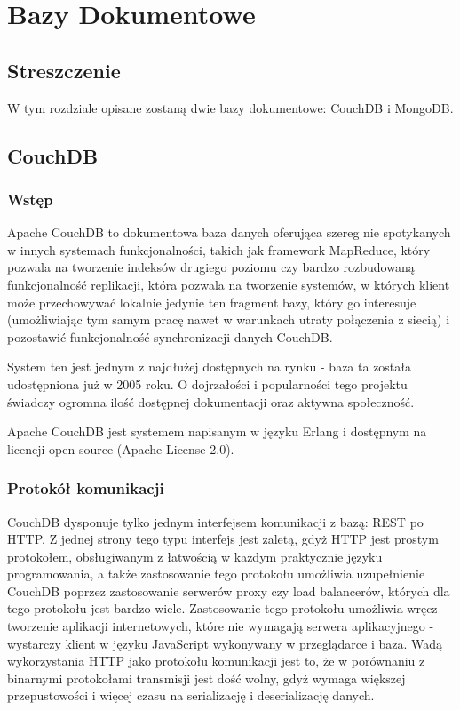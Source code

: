 \chapter{Bazy Dokumentowe}

\section*{Streszczenie}
W tym rozdziale opisane zostaną dwie bazy dokumentowe: CouchDB i MongoDB.

\section{CouchDB}
\label{sec:couchdb}

\subsection*{Wstęp}

Apache CouchDB to dokumentowa baza danych oferująca szereg nie spotykanych w innych systemach funkcjonalności, takich jak framework MapReduce, który pozwala na tworzenie indeksów drugiego poziomu czy bardzo rozbudowaną funkcjonalność replikacji, która pozwala na tworzenie systemów, w których klient może przechowywać lokalnie jedynie ten fragment bazy, który go interesuje (umożliwiając tym samym pracę nawet w warunkach utraty połączenia z siecią) i pozostawić funkcjonalność synchronizacji danych CouchDB.

System ten jest jednym z najdłużej dostępnych na rynku - baza ta została udostępniona już w 2005 roku.
O dojrzałości i popularności tego projektu świadczy ogromna ilość dostępnej dokumentacji oraz aktywna społeczność.

Apache CouchDB jest systemem napisanym w języku Erlang i dostępnym na licencji open source (Apache License 2.0).

\subsection*{Protokół komunikacji}

CouchDB dysponuje tylko jednym interfejsem komunikacji z bazą: REST po HTTP.
Z jednej strony tego typu interfejs jest zaletą, gdyż HTTP jest prostym protokołem, obsługiwanym z łatwością w każdym praktycznie języku programowania, a także zastosowanie tego protokołu umożliwia uzupełnienie CouchDB poprzez zastosowanie serwerów proxy czy load balancerów, których dla tego protokołu jest bardzo wiele.
Zastosowanie tego protokołu umożliwia wręcz tworzenie aplikacji internetowych, które nie wymagają serwera aplikacyjnego - wystarczy klient w języku JavaScript wykonywany w przeglądarce i baza.
Wadą wykorzystania HTTP jako protokołu komunikacji jest to, że w porównaniu z binarnymi protokołami transmisji jest dość wolny, gdyż wymaga większej przepustowości i więcej czasu na serializację i deserializację danych.

